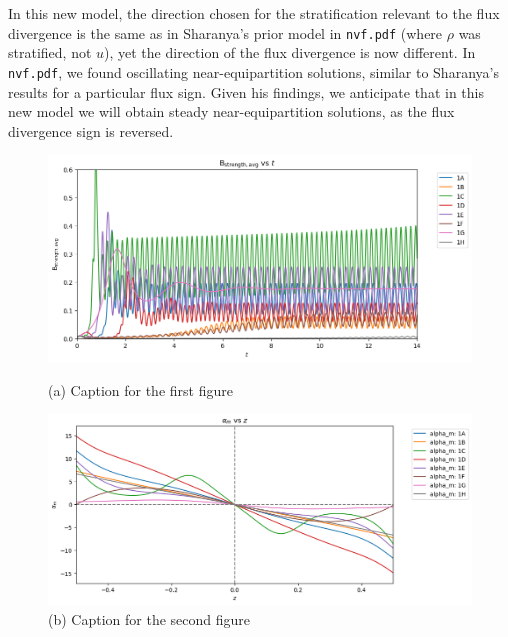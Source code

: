 \documentclass[a4paper,10pt]{article}
\newcommand{\1}{_\mathrm{1}}					   	%
\newcommand{\2}{_\mathrm{2}}					   	%
\begin{document}
In this new model, the direction chosen for the stratification relevant to the flux divergence is the same as in Sharanya's prior model in \texttt{nvf.pdf} (where \( \rho \) was stratified, not \( u \)), yet the direction of the flux divergence is now different. In \texttt{nvf.pdf}, we found oscillating near-equipartition solutions, similar to Sharanya's results for a particular flux sign. Given his findings, we anticipate that in this new model we will obtain steady near-equipartition solutions, as the flux divergence sign is reversed.
\begin{figure}[h]
    \centering
    \begin{minipage}{\linewidth}
        \centering
        \includegraphics[width=\linewidth]{B_strength_avg_vs_time.png}
        \caption{(a) Caption for the first figure}
        \label{fig:fig1}
    \end{minipage}
    
    \vspace{0.5cm} %
    
    \begin{minipage}{\linewidth}
        \centering
        \includegraphics[width=\linewidth]{alpha_m_vs_z_final.png}
        \caption{(b) Caption for the second figure}
        \label{fig:fig2}
    \end{minipage}
\end{figure}
\end{document}
